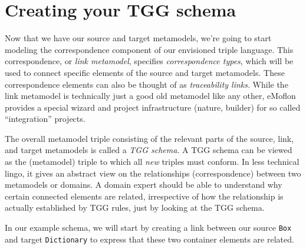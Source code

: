 \newpage
\hypertarget{TGGSchema}{}
\section{Creating your TGG schema}
\genHeader

Now that we have our source and target metamodels, we're going to start modeling the correspondence component of our envisioned triple language. 
This correspondence, or \emph{link metamodel}, specifies \emph{correspondence types}, which will be used to connect specific elements of the source and target metamodels. 
These correspondence elements can also be thought of as \emph{traceability links}.
%
While the link metamodel is technically just a good old metamodel like any other, eMoflon provides a special wizard and project infrastructure (nature, builder) for so called ``integration'' projects. 

The overall metamodel triple consisting of the relevant parts of the source, link, and target metamodels is called a \emph{TGG schema}.
%
A TGG schema can be viewed as the (metamodel) triple to which all \emph{new} triples must conform. 
In less technical lingo, it gives an abstract view on the relationships (correspondence) between two metamodels or domains. 
A domain expert should be able to understand why certain connected elements are related, irrespective of how the relationship is actually established by TGG rules, just by looking at the TGG schema. 

In our example schema, we will start by creating a link between our source \texttt{Box} and target \texttt{Dictionary} to express that these two container elements are related.

